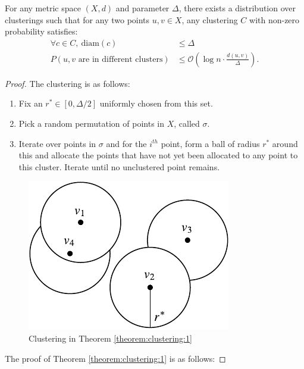 \begin{theorem} \label{theorem:clustering:1}
For any metric space $(X,d)$ and parameter $\Delta$, there exists a distribution over clusterings such that for any two points $u,v \in X$, any clustering $C$ with non-zero probability satisfies:
\begin{align*}
\forall c \in C,\ \mathrm{diam} (c) &\le \Delta \nonumber\\
P (u,v \text{ are in different clusters}) &\le \mathcal{O} \left( \log{n} \cdot \frac{d(u,v)}{\Delta} \right). \nonumber
\end{align*}
\end{theorem}
\begin{proof}
The clustering is as follows:
\begin{enumerate}
\item Fix an $r^* \in [0,\Delta/2]$ uniformly chosen from this set.
\item Pick a random permutation of points in $X$, called $\sigma$.
\item Iterate over points in $\sigma$ and for the $i^{th}$ point, form a ball of radius $r^*$ around this and allocate the points that have not yet been allocated to any point to this cluster. Iterate until no unclustered point remains.
\end{enumerate}

\begin{figure}[ht]
\centering
\includegraphics{./img/rand-clustering.pdf}
\caption{Clustering in Theorem \ref{theorem:clustering:1}}
\label{fig:3}
\end{figure}

The proof of Theorem \ref{theorem:clustering:1} is as follows:


\end{proof}
